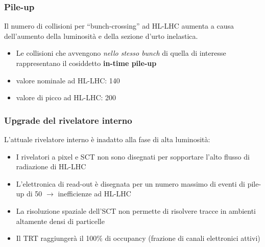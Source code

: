 \documentclass{beamer}
\begin{document}
\begin{frame}[t]
\frametitle{Pile-up}
Il numero di collisioni per ``bunch-crossing'' ad HL-LHC aumenta
a causa dell'aumento della luminosit\`a e della sezione d'urto inelastica.\\

\begin{itemize}
\item Le collisioni che avvengono \textit{nello stesso bunch} di quella di interesse
rappresentano il cosiddetto \textbf{in-time pile-up}
\item valore nominale ad HL-LHC: 140
\item valore di picco ad HL-LHC: 200
\end{itemize}




\end{frame}


\begin{frame}
\frametitle{Upgrade del rivelatore interno}
L'attuale rivelatore interno \`e inadatto alla fase di alta luminosit\`a:
\pause
\begin{itemize}
\item<+-> I rivelatori a pixel e SCT non sono disegnati per sopportare l'alto
flusso di radiazione di HL-LHC
\item<+-> L'elettronica di read-out \`e disegnata per un numero massimo di eventi
		di pile-up di 50 $\rightarrow$ inefficienze ad HL-LHC
\item<+-> La risoluzione spaziale dell'SCT non permette di risolvere tracce
		in ambienti altamente densi di particelle
\item<+-> Il TRT raggiunger\`a il 100\% di occupancy (frazione di canali elettronici attivi)
\end{itemize}

\bigskip


\end{frame}
\end{document}
